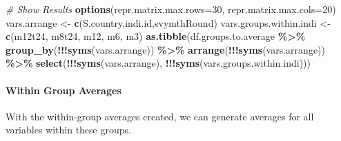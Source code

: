 \documentclass[
]{book}
\newenvironment{Shaded}{\begin{snugshade}}{\end{snugshade}}
\newcommand{\CommentTok}[1]{\textcolor[rgb]{0.56,0.35,0.01}{\textit{#1}}}
\newcommand{\DataTypeTok}[1]{\textcolor[rgb]{0.13,0.29,0.53}{#1}}
\newcommand{\DecValTok}[1]{\textcolor[rgb]{0.00,0.00,0.81}{#1}}
\newcommand{\KeywordTok}[1]{\textcolor[rgb]{0.13,0.29,0.53}{\textbf{#1}}}
\newcommand{\NormalTok}[1]{#1}
\newcommand{\OperatorTok}[1]{\textcolor[rgb]{0.81,0.36,0.00}{\textbf{#1}}}
\newcommand{\StringTok}[1]{\textcolor[rgb]{0.31,0.60,0.02}{#1}}
\begin{document}
\begin{Shaded}
\begin{Highlighting}[]
\CommentTok{\# Show Results}
\KeywordTok{options}\NormalTok{(}\DataTypeTok{repr.matrix.max.rows=}\DecValTok{30}\NormalTok{, }\DataTypeTok{repr.matrix.max.cols=}\DecValTok{20}\NormalTok{)}
\NormalTok{vars.arrange \textless{}{-}}\StringTok{ }\KeywordTok{c}\NormalTok{(}\StringTok{\textquotesingle{}S.country\textquotesingle{}}\NormalTok{,}\StringTok{\textquotesingle{}indi.id\textquotesingle{}}\NormalTok{,}\StringTok{\textquotesingle{}svymthRound\textquotesingle{}}\NormalTok{)}
\NormalTok{vars.groups.within.indi \textless{}{-}}\StringTok{ }\KeywordTok{c}\NormalTok{(}\StringTok{\textquotesingle{}m12t24\textquotesingle{}}\NormalTok{, }\StringTok{\textquotesingle{}m8t24\textquotesingle{}}\NormalTok{, }\StringTok{\textquotesingle{}m12\textquotesingle{}}\NormalTok{, }\StringTok{\textquotesingle{}m6\textquotesingle{}}\NormalTok{, }\StringTok{\textquotesingle{}m3\textquotesingle{}}\NormalTok{)}
\KeywordTok{as.tibble}\NormalTok{(df.groups.to.average }\OperatorTok{\%\textgreater{}\%}
\StringTok{          }\KeywordTok{group\_by}\NormalTok{(}\OperatorTok{!!!}\KeywordTok{syms}\NormalTok{(vars.arrange)) }\OperatorTok{\%\textgreater{}\%}
\StringTok{          }\KeywordTok{arrange}\NormalTok{(}\OperatorTok{!!!}\KeywordTok{syms}\NormalTok{(vars.arrange)) }\OperatorTok{\%\textgreater{}\%}
\StringTok{          }\KeywordTok{select}\NormalTok{(}\OperatorTok{!!!}\KeywordTok{syms}\NormalTok{(vars.arrange), }\OperatorTok{!!!}\KeywordTok{syms}\NormalTok{(vars.groups.within.indi)))}
\end{Highlighting}
\end{Shaded}

\hypertarget{within-group-averages}{%
\paragraph{Within Group Averages}\label{within-group-averages}}

With the within-group averages created, we can generate averages for all variables within these groups.
\end{document}
